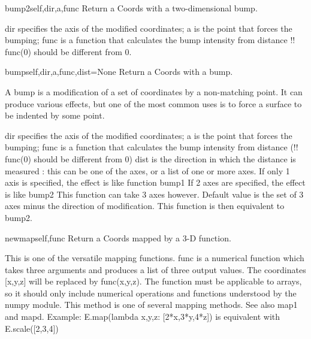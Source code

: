 \begin{funcdesc}{bump2}{self,dir,a,func}
Return a Coords with a two-dimensional bump.

        dir specifies the axis of the modified coordinates;
        a is the point that forces the bumping;
        func is a function that calculates the bump intensity from distance
        !! func(0) should be different from 0.
        
\end{funcdesc}

\begin{funcdesc}{bump}{self,dir,a,func,dist=None}
Return a Coords with a bump.

        A bump is a modification of a set of coordinates by a non-matching
        point. It can produce various effects, but one of the most common
        uses is to force a surface to be indented by some point.
        
        dir specifies the axis of the modified coordinates;
        a is the point that forces the bumping;
        func is a function that calculates the bump intensity from distance
        (!! func(0) should be different from 0)
        dist is the direction in which the distance is measured : this can
        be one of the axes, or a list of one or more axes.
        If only 1 axis is specified, the effect is like function bump1
        If 2 axes are specified, the effect is like bump2
        This function can take 3 axes however.
        Default value is the set of 3 axes minus the direction of modification.
        This function is then equivalent to bump2.
        
\end{funcdesc}

\begin{funcdesc}{newmap}{self,func}
Return a Coords mapped by a 3-D function.

        This is one of the versatile mapping functions.
        func is a numerical function which takes three arguments and produces
        a list of three output values. The coordinates [x,y,z] will be
        replaced by func(x,y,z).
        The function must be applicable to arrays, so it should
        only include numerical operations and functions understood by the
        numpy module.
        This method is one of several mapping methods. See also map1 and mapd.
        Example: E.map(lambda x,y,z: [2*x,3*y,4*z])
        is equivalent with E.scale([2,3,4])
        
\end{funcdesc}

